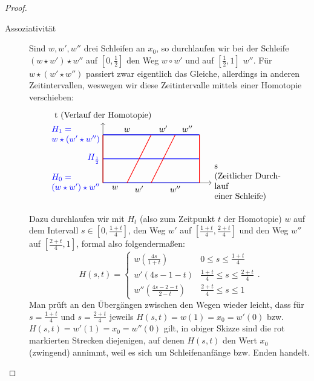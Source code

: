 \begin{proof}
\begin{description}
        \item[Assoziativität] Sind $w,w',w''$ drei Schleifen an  $x_0$, so durchlaufen wir bei der Schleife $(w \star w') \star w''$ auf $[0,\frac{1}{2}]$ den Weg $w \circ  w'$ und auf $[\frac{1}{2},1]$ $w''$. Für $w \star (w' \star w'')$  passiert zwar eigentlich das Gleiche, allerdings in anderen Zeitintervallen, weswegen wir diese Zeitintervalle mittels einer Homotopie verschieben:
            \[
            \begin{tikzpicture}
                \draw (0,0) --  (1,0) node[anchor=north, midway] {$w$} --  (2,0) node[anchor=north,midway]{$w'$} -- (4,0) node[anchor=north, midway] {$w''$} -- (4,2) -- (3,2) node[anchor=south, midway] {$w''$} -- (2,2) node[anchor=south, midway] {$w'$} -- (0,2) node[anchor=south, midway] {$w$} -- cycle;
                \draw[->] (0,0) -- (4.5,0) node[anchor=west, text width =3cm] {s \\ (Zeitlicher Durchlauf \\einer Schleife)};
                \draw[->] (0,0) -- (0,2.5) node[anchor=south] {t (Verlauf der Homotopie)};
                \draw[blue,thick] (0,2) node[anchor=east, text width=2cm] {$H_1 =$ \\ $w \star (w' \star w'')$} -- (4,2);
                \draw[blue,thick] (0,0) node[anchor=east, text width=2cm] {$H_0 =$ \\$(w \star w') \star w''$} --(4,0);
                \draw[blue,thick] (0,1) node[anchor=east] {$H_{\frac{1}{2}}$} --(4,1);
                \draw[red,thick] (2,2) -- (1,0);
                \draw[red,thick] (2,0) -- (3,2);
                \draw[red,thick] (0,0) -- (0,2);
                \draw[red, thick] (4,0) -- (4,2);
            \end{tikzpicture}
        \]
        Dazu durchlaufen wir mit $H_t$ (also zum Zeitpunkt  $t$ der Homotopie) $w$ auf dem Intervall $s\in [0, \frac{1+t}{4}]$, den Weg $w'$ auf  $[\frac{1+t}{4},\frac{2+t}{4}]$ und den Weg $w''$ auf  $[\frac{2+t}{4},1]$, formal also folgendermaßen:
    \[
        H(s,t) = \begin{cases}
            w\left( \frac{4s}{1+t} \right) & 0 \leq  s \leq  \frac{1+t}{4} \\
            w'(4s-1-t) & \frac{1+t}{4}\leq s \leq  \frac{2+t}{4} \\
            w''\left( \frac{4s-2-t}{2-t} \right) & \frac{2+t}{4}\leq s\leq 1
        \end{cases}
    .\] 
    Man prüft an den Übergängen zwischen den Wegen wieder leicht, dass für  $s = \frac{1+t}{4}$ und $s = \frac{2+t}{4}$ jeweils $H(s,t) = w(1) = x_0 = w'(0)$ bzw. $H(s,t) = w'(1) = x_0 = w''(0)$ gilt, in obiger Skizze sind die rot markierten Strecken diejenigen, auf denen $H(s,t)$ den Wert  $x_0$ (zwingend) annimmt, weil es sich um Schleifenanfänge bzw. Enden handelt.

\end{description}
\end{proof}
